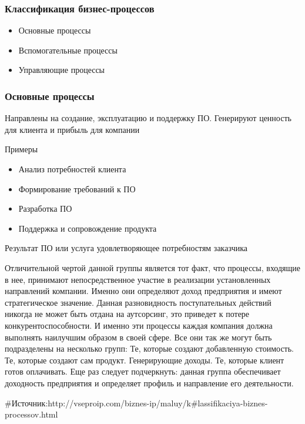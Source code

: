 \documentclass{../industrial-development}
\begin{document}
\begin{frame} \frametitle{Классификация бизнес-процессов}
	\begin{itemize}
		\item Основные процессы
		\item Вспомогательные процессы
		\item Управляющие процессы
	\end{itemize}
\end{frame}
\lecturenotes


\begin{frame} \frametitle{Основные процессы}
	\begin{block}{}
		Направлены на создание, эксплуатацию и поддержку ПО. Генерируют ценность для клиента и прибыль для компании
	\end{block}
	\begin{block}{Примеры}
		\begin{itemize}
			\item Анализ потребностей клиента
			\item Формирование требований к ПО
			\item Разработка ПО
			\item Поддержка и сопровождение продукта
		\end{itemize}
	\end{block}
	\begin{block}{Результат}
		ПО или услуга удовлетворяющее потребностям заказчика
	\end{block}
\end{frame}
\lecturenotes

Отличительной чертой данной группы является тот факт, что процессы, входящие в нее, принимают непосредственное участие в реализации установленных направлений компании. Именно они определяют доход предприятия и имеют стратегическое значение. Данная разновидность поступательных действий никогда не может быть отдана на аутсорсинг, это приведет к потере конкурентоспособности. И именно эти процессы каждая компания должна выполнять наилучшим образом в своей сфере. Все они так же могут быть подразделены на несколько групп: Те, которые создают добавленную стоимость. Те, которые создают сам продукт. Генерирующие доходы. Те, которые клиент готов оплачивать. Еще раз следует подчеркнуть: данная группа обеспечивает доходность предприятия и определяет профиль и направление его деятельности.

#Источник:http://vseproip.com/biznes-ip/maluy/k#lassifikaciya-biznes-processov.html
\end{document}
